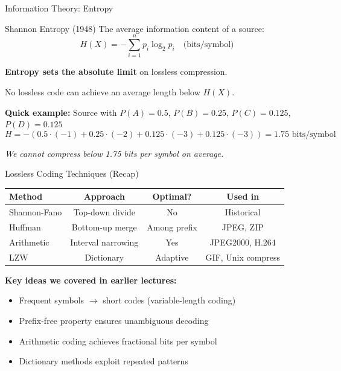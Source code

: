 \documentclass[aspectratio=169,12pt]{beamer}
\begin{document}
\begin{frame}{Information Theory: Entropy}
    \begin{block}{Shannon Entropy (1948)}
        The average information content of a source:
        \[
            H(X) = -\sum_{i=1}^{n} p_i \log_2 p_i \quad \text{(bits/symbol)}
        \]
    \end{block}
    
    \vspace{0.2cm}
    \textbf{Entropy sets the absolute limit} on lossless compression.
    
    No lossless code can achieve an average length below $H(X)$.
    
    \vspace{0.3cm}
    \textbf{Quick example:} Source with $P(A)=0.5$, $P(B)=0.25$, $P(C)=0.125$, $P(D)=0.125$
    \[
        H = -(0.5 \cdot (-1) + 0.25 \cdot (-2) + 0.125 \cdot (-3) + 0.125 \cdot (-3)) = 1.75 \text{ bits/symbol}
    \]
    
    \textit{We cannot compress below 1.75 bits per symbol on average.}
\end{frame}

\begin{frame}{Lossless Coding Techniques (Recap)}
    \begin{center}
        \begin{tabular}{l|c|c|c}
            \toprule
            \textbf{Method} & \textbf{Approach} & \textbf{Optimal?} & \textbf{Used in} \\
            \midrule
            Shannon-Fano & Top-down divide & No & Historical \\
            Huffman & Bottom-up merge & Among prefix & JPEG, ZIP \\
            Arithmetic & Interval narrowing & Yes & JPEG2000, H.264 \\
            LZW & Dictionary & Adaptive & GIF, Unix compress \\
            \bottomrule
        \end{tabular}
    \end{center}
    
    \vspace{0.3cm}
    \textbf{Key ideas we covered in earlier lectures:}
    \begin{itemize}
        \item Frequent symbols $\rightarrow$ short codes (variable-length coding)
        \item Prefix-free property ensures unambiguous decoding
        \item Arithmetic coding achieves fractional bits per symbol
        \item Dictionary methods exploit repeated patterns
    \end{itemize}
\end{frame}
\end{document}
